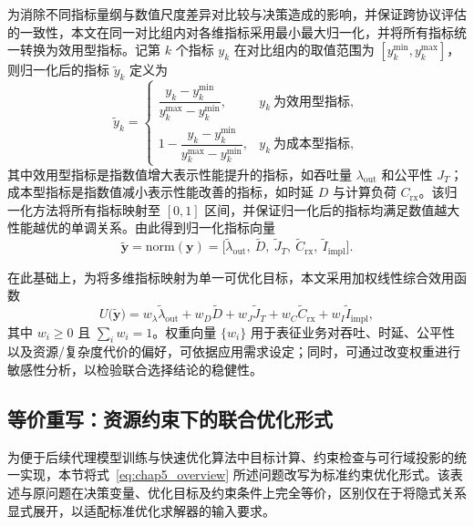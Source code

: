 为消除不同指标量纲与数值尺度差异对比较与决策造成的影响，并保证跨协议评估的一致性，本文在同一对比组内对各维指标采用最小最大归一化，并将所有指标统一转换为效用型指标。记第 $k$ 个指标 $y_k$ 在对比组内的取值范围为 $[y_k^{\min}, y_k^{\max}]$，则归一化后的指标 $\tilde{y}_k$ 定义为
\begin{equation}
	\tilde{y}_k =
	\begin{cases}
	\dfrac{y_k-y_k^{\min}}{y_k^{\max}-y_k^{\min}}, & y_k \ \text{为效用型指标},\\[10pt]
	1-\dfrac{y_k-y_k^{\min}}{y_k^{\max}-y_k^{\min}}, & y_k \ \text{为成本型指标},
	\end{cases}
\end{equation}
其中效用型指标是指数值增大表示性能提升的指标，如吞吐量 $\lambda_{\mathrm{out}}$ 和公平性 $J_T$；成本型指标是指数值减小表示性能改善的指标，如时延 $D$ 与计算负荷 $C_{\mathrm{rx}}$。该归一化方法将所有指标映射至 $[0,1]$ 区间，并保证归一化后的指标均满足数值越大性能越优的单调关系。由此得到归一化指标向量
\begin{equation}
	\tilde{\mathbf{y}}=\mathrm{norm}(\mathbf{y})
	=\big[\tilde{\lambda}_{\mathrm{out}},\ \tilde{D},\ \tilde{J}_T,\ \tilde{C}_{\mathrm{rx}},\ \tilde{I}_{\mathrm{impl}}\big].
\end{equation}

在此基础上，为将多维指标映射为单一可优化目标，本文采用加权线性综合效用函数
\begin{equation}
	U\big(\tilde{\mathbf{y}}\big)=
	w_{\lambda}\tilde{\lambda}_{\mathrm{out}}
	+w_{D}\tilde{D}
	+w_{J}\tilde{J}_T
	+w_{C}\tilde{C}_{\mathrm{rx}}
	+w_{I}\tilde{I}_{\mathrm{impl}},
\end{equation}
其中 $w_i\ge 0$ 且 $\sum_i w_i=1$。权重向量 $\{w_i\}$ 用于表征业务对吞吐、时延、公平性以及资源/复杂度代价的偏好，可依据应用需求设定；同时，可通过改变权重进行敏感性分析，以检验联合选择结论的稳健性。

\subsection{等价重写：资源约束下的联合优化形式}
为便于后续代理模型训练与快速优化算法中目标计算、约束检查与可行域投影的统一实现，本节将式~\eqref{eq:chap5_overview} 所述问题改写为标准约束优化形式。该表述与原问题在决策变量、优化目标及约束条件上完全等价，区别仅在于将隐式关系显式展开，以适配标准优化求解器的输入要求。

